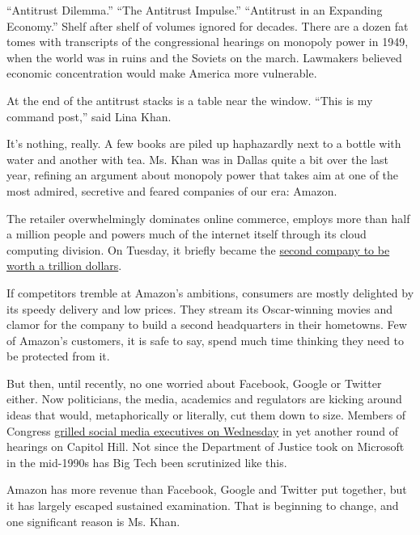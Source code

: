 ``Antitrust Dilemma.'' ``The Antitrust Impulse.'' ``Antitrust in an
Expanding Economy.'' Shelf after shelf of volumes ignored for decades.
There are a dozen fat tomes with transcripts of the congressional
hearings on monopoly power in 1949, when the world was in ruins and the
Soviets on the march. Lawmakers believed economic concentration would
make America more vulnerable.

At the end of the antitrust stacks is a table near the window. ``This is
my command post,'' said Lina Khan.

It's nothing, really. A few books are piled up haphazardly next to a
bottle with water and another with tea. Ms. Khan was in Dallas quite a
bit over the last year, refining an argument about monopoly power that
takes aim at one of the most admired, secretive and feared companies of
our era: Amazon.

The retailer overwhelmingly dominates online commerce, employs more than
half a million people and powers much of the internet itself through its
cloud computing division. On Tuesday, it briefly became the
\href{https://www.nytimes3xbfgragh.onion/2018/09/04/technology/amazon-stock-price-1-trillion-value.html?action=click\&module=Top\%20Stories\&pgtype=Homepage}{second
company to be worth a trillion dollars}.

If competitors tremble at Amazon's ambitions, consumers are mostly
delighted by its speedy delivery and low prices. They stream its
Oscar-winning movies and clamor for the company to build a second
headquarters in their hometowns. Few of Amazon's customers, it is safe
to say, spend much time thinking they need to be protected from it.

But then, until recently, no one worried about Facebook, Google or
Twitter either. Now politicians, the media, academics and regulators are
kicking around ideas that would, metaphorically or literally, cut them
down to size. Members of Congress
\href{https://www.nytimes3xbfgragh.onion/2018/09/05/technology/lawmakers-facebook-twitter-foreign-influence-hearing.html?action=click\&module=Well\&pgtype=Homepage\&section=Technology}{grilled
social media executives on Wednesday} in yet another round of hearings
on Capitol Hill. Not since the Department of Justice took on Microsoft
in the mid-1990s has Big Tech been scrutinized like this.

Amazon has more revenue than Facebook, Google and Twitter put together,
but it has largely escaped sustained examination. That is beginning to
change, and one significant reason is Ms. Khan.


